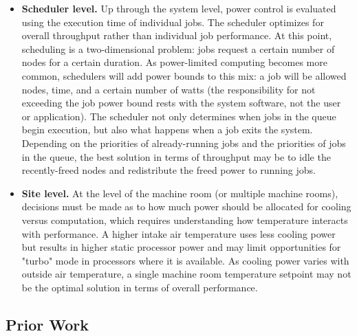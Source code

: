 \begin{itemize}
\item \textbf{Scheduler level.}  Up through the system level, power control is evaluated
using the execution time of individual jobs.  The scheduler optimizes for overall throughput
rather than individual job performance.  At this point, scheduling is a two-dimensional 
problem:  jobs request a certain number of nodes for a certain duration.  As power-limited
computing becomes more common, schedulers will add power bounds to this mix:  a job will
be allowed nodes, time, and a certain number of watts (the responsibility for not exceeding
the job power bound rests with the system software, not the user or application).  The 
scheduler not only determines when jobs in the queue begin execution, but also what happens
when a job exits the system.  Depending on the priorities of already-running jobs and the
priorities of jobs in the queue, the best solution in terms of throughput may be to idle
the recently-freed nodes and redistribute the freed power to running jobs.

\item \textbf{Site level.}  At the level of the machine room (or multiple machine rooms),
decisions must be made as to how much power should be allocated for cooling versus computation,
which requires understanding how temperature interacts with performance.  A higher intake
air temperature uses less cooling power but results in higher static processor power and 
may limit opportunities for "turbo" mode in processors where it is available.  As cooling
power varies with outside air temperature, a single machine room temperature setpoint may 
not be the optimal solution in terms of overall performance.  

\end{itemize}

\subsection{Prior Work}
\label{sub:priorwork}


